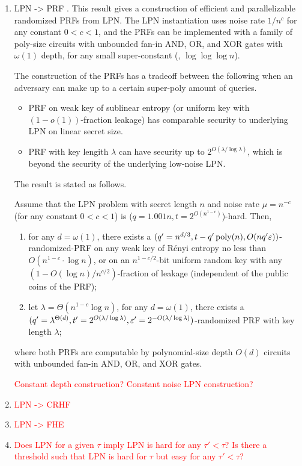 \begin{enumerate}
	\item LPN -> PRF \cite{EC:YuSte16}.
	This result gives a construction of efficient and parallelizable randomized PRFs from LPN.
	The LPN instantiation uses noise rate $1/n^c$ for any constant $0 < c < 1$,
	and the PRFs can be implemented with a family of poly-size circuits with unbounded fan-in AND, OR, and XOR gates with $\omega(1)$ depth, for any small super-constant (\eg, $\log\log\log n$).
	
	The construction of the PRFs has a tradeoff between the following when an adversary can make up to a certain super-poly amount of queries.
	\begin{itemize}
		\item PRF on weak key of sublinear entropy (or uniform key with $(1-o(1))$-fraction leakage) has comparable security to underlying LPN on linear secret size.
		\item PRF with key lengith $\lambda$ can have security up to $2^{O(\lambda/\log \lambda)}$, which is beyond the security of the underlying low-noise LPN.
	\end{itemize}
	
	The result is stated as follows.
	\begin{importedtheorem}
		Assume that the LPN problem with secret length $n$ and noise rate $\mu = n^{-c}$ (for any constant $0 < c < 1$) is ($ q=1.001n, t=2^{O(n^{1-c})} $)-hard.
		Then,
		\begin{enumerate}
			\item for any $d = \omega(1)$, there exists a $(q'=n^{d/3}, t-q'\operatorname{poly}(n), O(nq'\varepsilon))$-randomized-PRF on any weak key of R\'enyi entropy no less than $O(n^{1-c}\cdot \log n)$, or on an $n^{1-c/2}$-bit uniform random key with any $(1 - O(\log n)/n^{c/2})$-fraction of leakage (independent of the public coins of the PRF);
			\item let $\lambda = \Theta(n^{1-c}\log n)$, for any $d = \omega(1)$, there exists a $(q' = \lambda^{\Theta(d)}, t' = 2^{O(\lambda / \log \lambda)}, \varepsilon' = 2^{-O(\lambda/ \log \lambda)})$-randomized PRF with key length $\lambda$;
		\end{enumerate}
	where both PRFs are computable by polynomial-size depth $O(d)$ circuits with unbounded fan-in AND, OR, and XOR gates.
	\end{importedtheorem}
	
	\textcolor{red}{Constant depth construction? 
	Constant noise LPN construction?}
	
	\item \textcolor{red}{LPN -> CRHF}
	
	\item \textcolor{red}{LPN -> FHE}
	
	\item \textcolor{red}{Does LPN for a given $\tau$ imply LPN is hard for any $\tau' < \tau$?
	Is there a threshold such that LPN is hard for $\tau$ but easy for any $\tau' < \tau$?}
\end{enumerate}